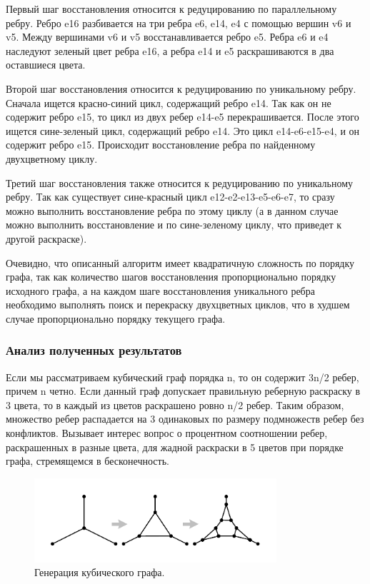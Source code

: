 Первый шаг восстановления относится к редуцированию по параллельному ребру. Ребро e16 разбивается на три ребра e6, e14, e4 с помощью вершин v6 и v5.
Между вершинами v6 и v5 восстанавливается ребро e5.
Ребра e6 и e4 наследуют зеленый цвет ребра e16, а ребра e14 и e5 раскрашиваются в два оставшиеся цвета.

Второй шаг восстановления относится к редуцированию по уникальному ребру.
Сначала ищется красно-синий цикл, содержащий ребро e14. Так как он не содержит ребро e15, то цикл из двух ребер e14-e5 перекрашивается.
После этого ищется сине-зеленый цикл, содержащий ребро e14.
Это цикл e14-e6-e15-e4, и он содержит ребро e15.
Происходит восстановление ребра по найденному двухцветному циклу.

Третий шаг восстановления также относится к редуцированию по уникальному ребру.
Так как существует сине-красный цикл e12-e2-e13-e5-e6-e7, то сразу можно выполнить восстановление ребра по этому циклу (а в данном случае можно выполнить восстановление и по сине-зеленому циклу, что приведет к другой раскраске).

Очевидно, что описанный алгоритм имеет квадратичную сложность по порядку графа, так как количество шагов восстановления пропорционально порядку исходного графа, а на каждом шаге восстановления уникального ребра необходимо выполнять поиск и перекраску двухцветных циклов, что в худшем случае пропорционально порядку текущего графа.

\subsubsection{Анализ полученных результатов}

Если мы рассматриваем кубический граф порядка n, то он содержит 3n/2 ребер, причем n четно.
Если данный граф допускает правильную реберную раскраску в 3 цвета, то в каждый из цветов раскрашено ровно n/2 ребер.
Таким образом, множество ребер распадается на 3 одинаковых по размеру подмножеств ребер без конфликтов.
Вызывает интерес вопрос о процентном соотношении ребер, раскрашенных в разные цвета, для жадной раскраски в 5 цветов при порядке графа, стремящемся в бесконечность.

\begin{figure}[ht]
	\centering
		\includegraphics[width=0.8\textwidth]{./pics/text_3_edge_coloring/9-bubble.pdf}
	\caption{Генерация кубического графа.}
	\label{fig:text_3_edge_coloring_9}
\end{figure}

